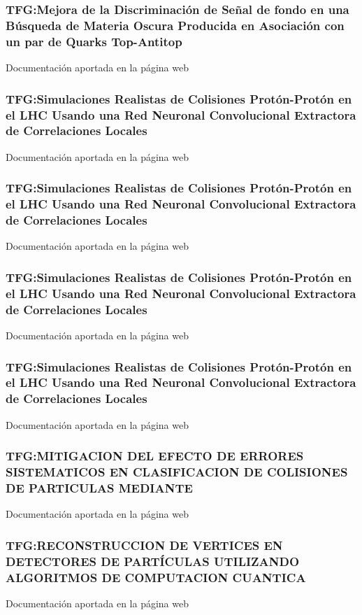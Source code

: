 \documentclass[a4paper, 11pt, twoside, openright]{report}
\begin{document}
\subsubsection{TFG:Mejora de la Discriminación de Señal de fondo en una Búsqueda de Materia Oscura Producida en Asociación con un par de Quarks Top-Antitop}
Documentación aportada en la página web
\subsubsection{TFG:Simulaciones Realistas de Colisiones Protón-Protón en el LHC Usando una Red Neuronal Convolucional Extractora de Correlaciones Locales}
Documentación aportada en la página web

\subsubsection{TFG:Simulaciones Realistas de Colisiones Protón-Protón en el LHC Usando una Red Neuronal Convolucional Extractora de Correlaciones Locales}
Documentación aportada en la página web

\subsubsection{TFG:Simulaciones Realistas de Colisiones Protón-Protón en el LHC Usando una Red Neuronal Convolucional Extractora de Correlaciones Locales}
Documentación aportada en la página web

\subsubsection{TFG:Simulaciones Realistas de Colisiones Protón-Protón en el LHC Usando una Red Neuronal Convolucional Extractora de Correlaciones Locales}
Documentación aportada en la página web

\subsubsection{TFG:MITIGACION DEL EFECTO DE ERRORES SISTEMATICOS EN CLASIFICACION DE COLISIONES DE PARTICULAS MEDIANTE}
Documentación aportada en la página web

\subsubsection{TFG:RECONSTRUCCION DE VERTICES EN DETECTORES DE PARTÍCULAS UTILIZANDO ALGORITMOS DE COMPUTACION CUANTICA}
Documentación aportada en la página web
\end{document}

